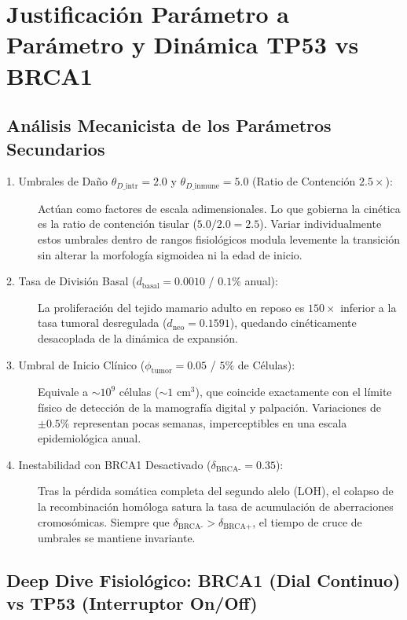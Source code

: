 \documentclass[10pt,a4paper]{article}
\begin{document}
\section{Justificación Parámetro a Parámetro y Dinámica TP53 vs BRCA1}

\subsection{Análisis Mecanicista de los Parámetros Secundarios}

\begin{description}
    \item[1. Umbrales de Daño $\theta_{D\text{\_intr}} = 2.0$ y $\theta_{D\text{\_inmune}} = 5.0$ (Ratio de Contención $2.5\times$):] Actúan como factores de escala adimensionales. Lo que gobierna la cinética es la ratio de contención tisular ($5.0 / 2.0 = 2.5$). Variar individualmente estos umbrales dentro de rangos fisiológicos modula levemente la transición sin alterar la morfología sigmoidea ni la edad de inicio.
    \item[2. Tasa de División Basal ($d_{\text{basal}} = 0.0010$ / $0.1\%$ anual):] La proliferación del tejido mamario adulto en reposo es $150\times$ inferior a la tasa tumoral desregulada ($d_{\text{neo}} = 0.1591$), quedando cinéticamente desacoplada de la dinámica de expansión.
    \item[3. Umbral de Inicio Clínico ($\phi_{\text{tumor}} = 0.05$ / $5\%$ de Células):] Equivale a $\sim 10^9$ células ($\sim 1\text{ cm}^3$), que coincide exactamente con el límite físico de detección de la mamografía digital y palpación. Variaciones de $\pm 0.5\%$ representan pocas semanas, imperceptibles en una escala epidemiológica anual.
    \item[4. Inestabilidad con BRCA1 Desactivado ($\delta_{\text{BRCA-}} = 0.35$):] Tras la pérdida somática completa del segundo alelo (LOH), el colapso de la recombinación homóloga satura la tasa de acumulación de aberraciones cromosómicas. Siempre que $\delta_{\text{BRCA-}} > \delta_{\text{BRCA+}}$, el tiempo de cruce de umbrales se mantiene invariante.
\end{description}

\subsection{Deep Dive Fisiológico: BRCA1 (Dial Continuo) vs TP53 (Interruptor On/Off)}
\end{document}
